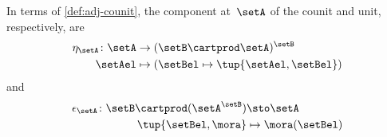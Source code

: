 In terms of \cref{def:adj-counit}, the component at~$\setA$ of the counit and unit, respectively, are
\begin{equation}
    \begin{aligned}
        \eta_\setA \colon \setA & \to  (\setB \cartprod \setA)^\setB \\
        \setAel                 & \mapsto (\setBel \mapsto \tup{\setAel,\setBel})
    \end{aligned}
\end{equation}
and
\begin{equation}
    \begin{aligned}
        \epsilon_\setA \colon \setB \cartprod (\setA^\setB) & \sto \setA \\
        \tup{\setBel,\mora}                                 & \mapsto \mora(\setBel)
    \end{aligned}
\end{equation}
